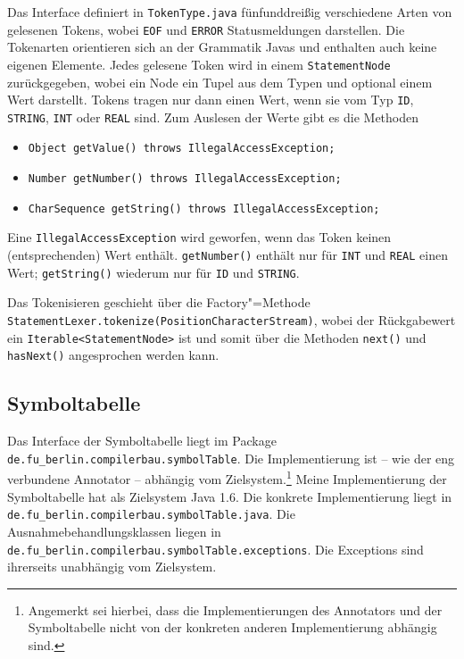 \documentclass[10pt,a4paper,ngerman,titlepage,tocindentauto]{scrartcl}
\newcommand{\n}{\linebreak[1]}
\begin{document}
			Das Interface definiert in \texttt{TokenType.java} fünfunddreißig verschiedene Arten von gelesenen Tokens,
			wobei \texttt{EOF} und \texttt{ERROR} Statusmeldungen darstellen. Die Tokenarten orientieren sich
			an der Grammatik Javas und enthalten auch keine eigenen Elemente. Jedes gelesene Token wird in einem
			\texttt{StatementNode} zurückgegeben, wobei ein Node ein Tupel aus dem Typen und optional einem Wert
			darstellt.
			Tokens tragen nur dann einen Wert, wenn sie vom Typ \texttt{ID}, \texttt{STRING}, \texttt{INT} oder
			\texttt{REAL} sind. Zum Auslesen der Werte gibt es die Methoden
			\begin{itemize}
				\item \texttt{Object getValue() throws IllegalAccessException;}
				\item \texttt{Number getNumber() throws IllegalAccessException;}
				\item \texttt{CharSequence getString() throws IllegalAccessException;}
			\end{itemize}
			Eine \texttt{IllegalAccessException} wird geworfen, wenn das Token keinen (entsprechenden)
			Wert enthält. \texttt{getNumber()} enthält nur für \texttt{INT} und \texttt{REAL} einen Wert;
			\texttt{getString()} wiederum nur für \texttt{ID} und \texttt{STRING}.
			
			Das Tokenisieren geschieht über die Factory"=Methode \texttt{StatementLexer.tokenize(Position\-Character\-Stream)},
			wobei der Rückgabewert ein \texttt{Iterable<StatementNode>} ist und somit über die Methoden \texttt{next()} und
			\texttt{hasNext()} angesprochen werden kann.
	
		\subsection{Symboltabelle}
			Das Interface der Symboltabelle liegt im Package \texttt{de.{\n}fu\_berlin.{\n}compilerbau.{\n}symbolTable}.
			Die Implementierung ist -- wie der eng verbundene Annotator -- abhängig vom Zielsystem.\footnote
			{Angemerkt sei hierbei, dass die Implementierungen des Annotators und der Symboltabelle nicht von
			der konkreten anderen Implementierung abhängig sind.}
			Meine Implementierung der Symboltabelle hat als Zielsystem Java 1.6. Die konkrete Implementierung
			liegt in \texttt{de.{\n}fu\_berlin.{\n}compilerbau.{\n}symbolTable.{\n}java}. Die Ausnahmebehandlungsklassen
			liegen in \texttt{de.{\n}fu\_berlin.{\n}compilerbau.{\n}symbolTable.{\n}exceptions}. Die Exceptions sind
			ihrerseits unabhängig vom Zielsystem.
			
\end{document}
